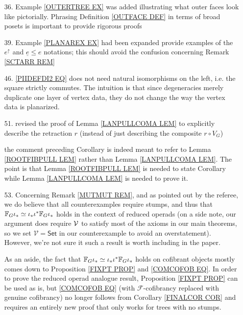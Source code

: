 \documentclass{article}
\begin{document}
\begin{itemize}
	\item[36.] Example \ref{OUTERTREE EX} was added illustrating what outer faces look like pictorially. 
	Phrasing Definition \ref{OUTFACE DEF} 
	in terms of broad posets   
	is important to provide rigorous proofs
	
	\item[39.] Example \ref{PLANAREX EX} had been expanded provide examples of the $e^{\uparrow}$
	and $\underline{e} \leq e$
	notations; this should avoid the confusion concerning 
	Remark \ref{SCTARR REM}
	
	\item[46.] \eqref{PIIDEFDI2 EQ} does not need natural isomorphisms on the left, i.e. the square strictly commutes. The intuition is that since degeneracies merely duplicate one layer of vertex data, they do not change the way the vertex data is planarized. 
	
	\item[51.] 
	revised the proof of Lemma \ref{LANPULLCOMA LEM}
	to explicitly describe the retraction $r$ (instead of just describing the composite $r \circ V_G$)
	
	the comment preceding Corollary \label{MONDEFCOR COR}
	is indeed meant to refer to Lemma \ref{ROOTFIBPULL LEM}
	rather than Lemma \ref{LANPULLCOMA LEM}.
	The point is that Lemma \ref{ROOTFIBPULL LEM}
	is needed to state Corollary \label{MONDEFCOR COR}
	while 
	Lemma \ref{LANPULLCOMA LEM} is needed to prove it.

	\item[53.] Concerning Remark \ref{MUTMUT REM},
	and as pointed out by the referee,
	we do believe that all counterexamples require stumps,
	and thus that
	$\mathbb{F}_G \iota_{\**} \simeq 
	\iota_{\**} \iota^{\**} \mathbb{F}_G \iota_{\**}$
	holds in the context of reduced operads
	(on a side note, our argument does require $\mathcal V$ to satisfy most of the axioms in our main theorems, 
	so we set $\mathcal{V}=\mathsf{Set}$ in our counterexample
	to avoid an overstatement).
%	
	However, we're not sure it such a result is worth including in the paper.
	
	As an aside, the fact that 	
	$\mathbb{F}_G \iota_{\**} \simeq 
	\iota_{\**} \iota^{\**} \mathbb{F}_G \iota_{\**}$
	holds on cofibrant objects mostly comes down to
	Proposition \ref{FIXPT PROP} 
	and \eqref{COMCOFOB EQ}.
%	
	In order to prove the reduced operad analogue result, 
	Proposition \ref{FIXPT PROP} can be used as is, 
	but \eqref{COMCOFOB EQ} 
	(with $\mathcal{F}$-cofibrancy replaced with genuine cofibrancy)
	no longer follows from Corollary \ref{FINALCOR COR}
	and requires an entirely new proof that only works
	for trees with no stumps.
	

\end{itemize}
\end{document}
